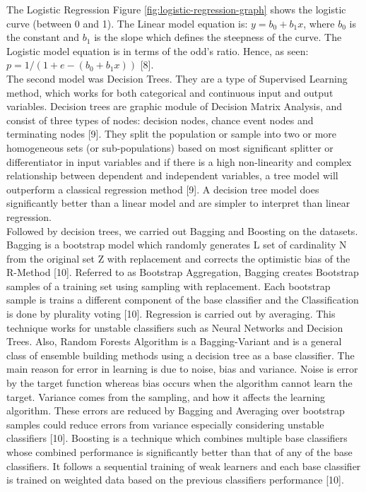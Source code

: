 \documentclass[conference]{IEEEtran}
\begin{document}
The Logistic Regression Figure \ref{fig:logistic-regression-graph} shows the logistic curve (between 0 and 1). The Linear model equation is: $y=b_0 + b_1x$, where $b_0$ is the constant and $b_1$ is the slope which defines the steepness of the curve. The Logistic model equation is in terms of the odd’s ratio. Hence, as seen: $p = 1/ (1+e-( b_0 + b_1x))$ [8].\\

The second model was Decision Trees. They are a type of Supervised Learning method, which works for both categorical and continuous input and output variables. Decision trees are graphic module of Decision Matrix Analysis, and consist of three types of nodes: decision nodes, chance event nodes and terminating nodes [9]. They split the population or sample into two or more homogeneous sets (or sub-populations) based on most significant splitter or differentiator in input variables and if there is a high non-linearity and complex relationship between dependent and independent variables, a tree model will outperform a classical regression method [9]. A decision tree model does significantly better than a linear model and are simpler to interpret than linear regression.\\

Followed by decision trees, we carried out Bagging and Boosting on the datasets. Bagging is a bootstrap model which randomly generates L set of cardinality N from the original set Z with replacement and corrects the optimistic bias of the R-Method [10]. Referred to as Bootstrap Aggregation, Bagging creates Bootstrap samples of a training set using sampling with replacement. Each bootstrap sample is trains a different component of the base classifier and the Classification is done by plurality voting [10]. Regression is carried out by averaging. This technique works for unstable classifiers such as Neural Networks and Decision Trees. Also, Random Forests Algorithm is a Bagging-Variant and is a general class of ensemble building methods using a decision tree as a base classifier.  The main reason for error in learning is due to noise, bias and variance. Noise is error by the target function whereas bias occurs when the algorithm cannot learn the target. Variance comes from the sampling, and how it affects the learning algorithm. These errors are reduced by Bagging and Averaging over bootstrap samples could reduce errors from variance especially considering unstable classifiers [10]. Boosting is a technique which combines multiple base classifiers whose combined performance is significantly better than that of any of the base classifiers. It follows a sequential training of weak learners and each base classifier is trained on weighted data based on the previous classifiers performance [10].\\
\end{document}
